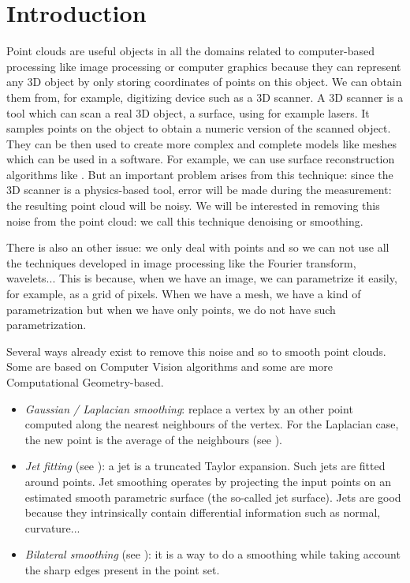 

\chapter{Introduction}

Point clouds are useful objects in all the domains related to computer-based
processing like image processing or computer graphics because they can
represent any 3D object by only storing coordinates of points on this object. We
can obtain them from, for example, digitizing device such as a 3D scanner. A 3D
scanner is a tool which can scan a real 3D object, a surface, using for example
lasers. It samples points on the object to obtain a numeric version of the
scanned object. They can be then used to create more complex and complete models
like meshes which can be used in a software. For example, we can use surface
reconstruction algorithms like \cite{alexa2003computing}. But an important
problem arises from this technique: since the 3D scanner is a physics-based
tool, error will be made during the measurement: the resulting point cloud will
be noisy. We will be interested in removing this noise from the point cloud: we
call this technique denoising or smoothing.

There is also an other issue: we only deal with points and so we can not use all
the techniques developed in image processing like the Fourier transform,
wavelets... This is because, when we have an image, we can parametrize it
easily, for example, as a grid of pixels.  When we have a mesh, we have a kind
of parametrization but when we have only points, we do not have such
parametrization.

Several ways already exist to remove this noise and so to smooth point clouds.
Some are based on Computer Vision algorithms and some are more Computational
Geometry-based.

\begin{itemize}
    \item \textit{Gaussian / Laplacian smoothing}: replace a vertex by an other point
        computed along the nearest neighbours of the vertex. For the Laplacian
        case, the new point is the average of the neighbours (see
        \cite{vollmer1999improved}).
    \item \textit{Jet fitting} (see \cite{cazals2005estimating}): a jet is a truncated
        Taylor expansion. Such jets are fitted around points. Jet smoothing
        operates by projecting the input points on an estimated smooth
        parametric surface (the so-called jet surface). Jets are good because
        they intrinsically contain differential information such as normal,
        curvature...
    \item \textit{Bilateral smoothing} (see \cite{huang2013edge}): it is a way to do a
        smoothing while taking account the sharp edges present in the point set.
\end{itemize}

